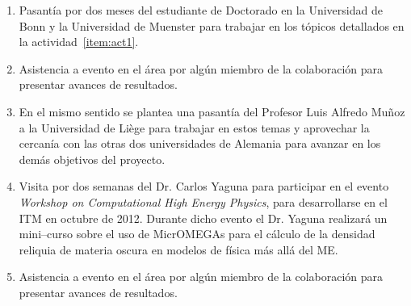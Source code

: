 \begin{enumerate}
\item Pasantía por dos meses del estudiante de Doctorado en la
  Universidad de Bonn y la Universidad de Muenster para trabajar en
  los tópicos detallados en la actividad~\ref{item:act1}.
  \label{item:act6}
\item Asistencia a evento en el área por algún miembro de la
  colaboración para presentar avances de resultados.

\item En el mismo sentido se plantea una pasantía del Profesor Luis
  Alfredo Muñoz a la Universidad de Liège para trabajar en estos temas y
  aprovechar la cercanía con las otras dos universidades de Alemania
  para avanzar en los demás objetivos del proyecto.
  \label{item:act8}
\item Visita por dos semanas del Dr. Carlos Yaguna para participar en
  el evento \emph{Workshop on Computational High Energy Physics}, para
  desarrollarse en el ITM en octubre de 2012. Durante dicho evento el
  Dr. Yaguna realizará un mini--curso sobre el uso de MicrOMEGAs para
  el cálculo de la densidad reliquia de materia oscura en modelos de física
  más allá del ME.
  \label{item:act9}
\item Asistencia a evento en el área por algún miembro de la
  colaboración para presentar avances de resultados.
\end{enumerate}




